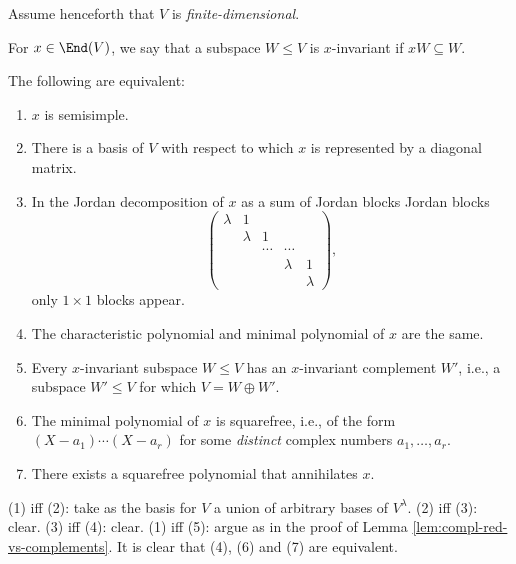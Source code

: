 \documentclass[reqno]{amsart} 
\begin{document}
Assume henceforth that $V$ is \emph{finite-dimensional}.

\begin{definition}
  For $x \in \End(V)$, we say that a subspace $W \leq V$ is $x$-invariant if $x W \subseteq W$.
\end{definition}

\begin{exercise}\label{exe:characterizations-of-semisimplicity-of-a-boring-old-matrix}
  The following are equivalent:
  \begin{enumerate}
  \item $x$ is semisimple.
  \item There is a basis of $V$ with respect to which $x$ is represented by a diagonal matrix.
  \item In the Jordan decomposition of $x$ as a sum of Jordan blocks Jordan blocks
    \begin{equation*}
      \begin{pmatrix}
        \lambda  & 1 &  &  & \\
           & \lambda   & 1 & & \\
           & & \dotsb   & \dotsb & \\
           & & &  \lambda    &  1\\
           & & &      &  \lambda
      \end{pmatrix}
,
    \end{equation*}
    only $1 \times 1$ blocks appear.
  \item The characteristic polynomial and minimal polynomial of $x$ are the same.
  \item Every $x$-invariant subspace $W \leq V$ has an $x$-invariant complement $W'$, i.e., a subspace $W' \leq V$ for which $V = W \oplus W'$.
  \item The minimal polynomial of $x$ is squarefree, i.e., of the form $(X - a_1) \dotsb (X - a_r)$ for some \emph{distinct} complex numbers $a_1,\dotsc,a_r$.
  \item There exists a squarefree polynomial that annihilates $x$.
  \end{enumerate}
  (1) iff (2): take as the basis for $V$ a union of arbitrary bases of $V^\lambda$.  (2) iff (3): clear.  (3) iff (4): clear.  (1) iff (5): argue as in the proof of Lemma \ref{lem:compl-red-vs-complements}.  It is clear that (4), (6) and (7) are equivalent.
\end{exercise}
\end{document}
